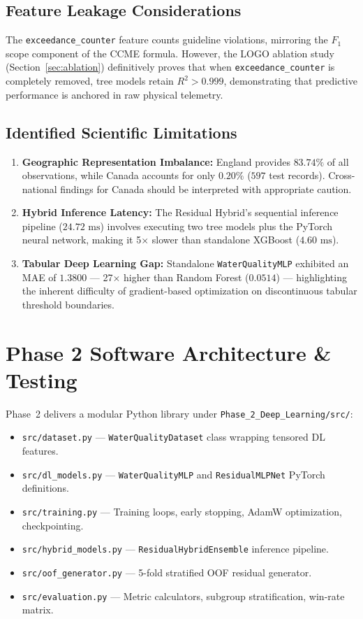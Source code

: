 \documentclass[conference]{IEEEtran}
\begin{document}
\subsection{Feature Leakage Considerations}
The \texttt{exceedance\_counter} feature counts guideline violations, mirroring the $F_1$ scope
component of the CCME formula. However, the LOGO ablation study (Section~\ref{sec:ablation})
definitively proves that when \texttt{exceedance\_counter} is completely removed, tree models
retain $R^2 > 0.999$, demonstrating that predictive performance is anchored in raw physical telemetry.

\subsection{Identified Scientific Limitations}
\begin{enumerate}
  \item \textbf{Geographic Representation Imbalance:} England provides $83.74\%$ of all observations,
        while Canada accounts for only $0.20\%$ ($597$ test records). Cross-national findings for
        Canada should be interpreted with appropriate caution.
  \item \textbf{Hybrid Inference Latency:} The Residual Hybrid's sequential inference pipeline
        ($24.72\text{ ms}$) involves executing two tree models plus the PyTorch neural network,
        making it 5$\times$ slower than standalone XGBoost ($4.60\text{ ms}$).
  \item \textbf{Tabular Deep Learning Gap:} Standalone \texttt{WaterQualityMLP} exhibited an MAE of
        $1.3800$ --- 27$\times$ higher than Random Forest ($0.0514$) --- highlighting the inherent
        difficulty of gradient-based optimization on discontinuous tabular threshold boundaries.
\end{enumerate}

\section{Phase 2 Software Architecture \& Testing}
\label{sec:software}

Phase~2 delivers a modular Python library under \texttt{Phase\_2\_Deep\_Learning/src/}:
\begin{itemize}
  \item \texttt{src/dataset.py} --- \texttt{WaterQualityDataset} class wrapping tensored DL features.
  \item \texttt{src/dl\_models.py} --- \texttt{WaterQualityMLP} and \texttt{ResidualMLPNet} PyTorch definitions.
  \item \texttt{src/training.py} --- Training loops, early stopping, AdamW optimization, checkpointing.
  \item \texttt{src/hybrid\_models.py} --- \texttt{ResidualHybridEnsemble} inference pipeline.
  \item \texttt{src/oof\_generator.py} --- 5-fold stratified OOF residual generator.
  \item \texttt{src/evaluation.py} --- Metric calculators, subgroup stratification, win-rate matrix.
\end{itemize}
\end{document}

